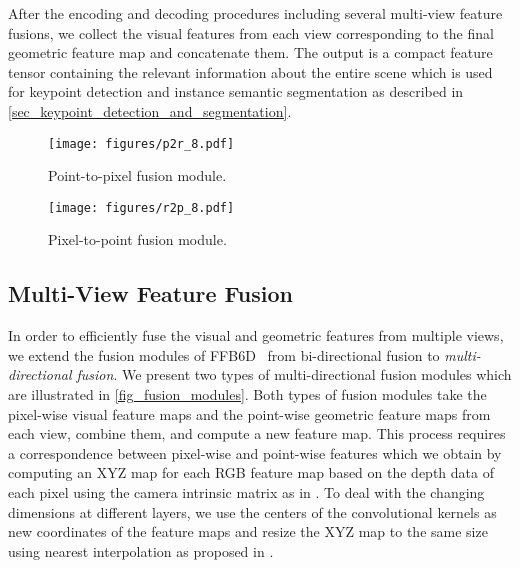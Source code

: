 After the encoding and decoding procedures including several multi-view feature fusions, we collect the visual features from each view corresponding to the final geometric feature map and concatenate them. The output is a compact feature tensor containing the relevant information about the entire scene which is used for keypoint detection and instance semantic segmentation as described in \cref{sec_keypoint_detection_and_segmentation}.


\begin{figure*}[tbh]
  \vspace{2mm} 
  \centering  
\begin{subfigure}[b]{0.48\textwidth}
  \texttt{[image: figures/p2r\_8.pdf]}
   \caption{Point-to-pixel fusion module.~~~~}
   \label{fig_pt2px_fusion}
\end{subfigure}
\begin{subfigure}[b]{0.48\textwidth}
  \centering  
  \texttt{[image: figures/r2p\_8.pdf]}
   \caption{Pixel-to-point fusion module.~~~~~}
   \label{fig_px2pt_fusion}
   \end{subfigure}
      \caption{Overview of our proposed multi-directional multi-view fusion modules. They combine pixel-wise visual features and point-wise geometric features by exploiting the correspondence between pixels and points using the nearest neighbor algorithm. We compute the resulting features using multiple shared MLPs with a single layer and max-pooling.
      For simplification, we depict an example with $N=2$ views and $K_\text{i}=K_\text{p}=3$ nearest neighbors. The points of ellipsis (...) illustrate the generalization for an arbitrary number of views $N$. Please refer to \cite{ffb6d} for better understanding the basic operations.
      }
   \label{fig_fusion_modules}
   \vspace{-1mm}
\end{figure*}



\subsection{Multi-View Feature Fusion}
\label{sec_multi_view_fusion}
In order to efficiently fuse the visual and geometric features from multiple views, we extend the fusion modules of FFB6D~\cite{ffb6d} from bi-directional fusion to \emph{multi-directional fusion}. We present two types of multi-directional fusion modules which are illustrated in \cref{fig_fusion_modules}.
Both types of fusion modules take the pixel-wise visual feature maps and the point-wise geometric feature maps from each view, combine them, and compute a new feature map.
This process requires a correspondence between pixel-wise and point-wise features which we obtain by computing an XYZ map for each RGB feature map based on the depth data of each pixel using the camera intrinsic matrix as in \cite{ffb6d}. To deal with the changing dimensions at different layers, we use the centers of the convolutional kernels as new coordinates of the feature maps and resize the XYZ map to the same size using nearest interpolation as proposed in \cite{ffb6d}.

